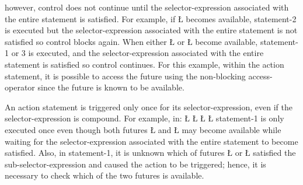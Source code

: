 \documentclass[openright,twoside]{report}
\begin{document}
however, control does not continue until the selector-expression associated with the entire statement is satisfied.
For example, if \LGinlinetrue\LGbegin\lgrinde\L{}\endlgrinde\LGend{} becomes available, statement-2 is executed but the selector-expression associated with the entire statement is not satisfied so control blocks again.
When either \LGinlinetrue\LGbegin\lgrinde\L{}\endlgrinde\LGend{} or \LGinlinetrue\LGbegin\lgrinde\L{}\endlgrinde\LGend{} become available, statement-1 or 3 is executed, and the selector-expression associated with the entire statement is satisfied so control continues.
For this example, within the action statement, it is possible to access the future using the non-blocking access-operator since the future is known to be available.

An action statement is triggered only once for its selector-expression, even if the selector-expression is compound.
For example, in:
\LGinlinefalse\LGbegin\lgrinde
\L{}
\L{\LB{}}
\L{}
\L{\LB{}}
\endlgrinde\LGend
statement-1 is only executed once even though both futures \LGinlinetrue\LGbegin\lgrinde\L{}\endlgrinde\LGend{} and \LGinlinetrue\LGbegin\lgrinde\L{}\endlgrinde\LGend{} may become available while waiting for the selector-expression associated with the entire statement to become satisfied.
Also, in statement-1, it is unknown which of futures \LGinlinetrue\LGbegin\lgrinde\L{}\endlgrinde\LGend{} or \LGinlinetrue\LGbegin\lgrinde\L{}\endlgrinde\LGend{} satisfied the sub-selector-expression and caused the action to be triggered;
hence, it is necessary to check which of the two futures is available.
\end{document}
